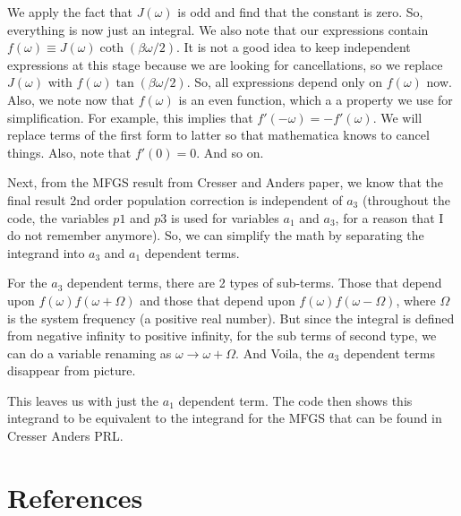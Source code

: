 \documentclass[11pt]{article}
\begin{document}
We apply the fact that $J(\omega)$ is odd and find that the constant is zero. So, everything is now just an integral. We also note that our expressions contain $f(\omega) \equiv J(\omega) \coth(\beta \omega/2)$. It is not a good idea to keep independent expressions at this stage because we are looking for cancellations, so we replace $J(\omega)$ with $f(\omega) \tan(\beta \omega/2)$. So, all expressions depend only on $f(\omega)$ now. Also, we note now that $f(\omega)$ is an even function, which a a property we use for simplification. For example, this implies that $f'(-\omega) = - f'(\omega)$. We will replace terms of the first form to latter so that mathematica knows to cancel things. Also, note that $f'(0)=0$. And so on.

Next, from the MFGS result from Cresser and Anders paper, we know that the final result 2nd order population correction is independent of $a_3$ (throughout the code, the variables $p1$ and $p3$ is used for variables $a_1$ and $a_3$, for a reason that I do not remember anymore). So, we can simplify the math by separating the integrand into $a_3$ and $a_1$ dependent terms. 

For the $a_3$ dependent terms, there are 2 types of sub-terms. Those that depend upon $f(\omega) f(\omega + \Omega)$ and those that depend upon $f(\omega) f(\omega - \Omega)$, where $\Omega$ is the system frequency (a positive real number). But since the integral is defined from negative infinity to positive infinity, for the sub terms of second type, we can do a variable renaming as $\omega \to \omega + \Omega$. And Voila, the $a_3$ dependent terms disappear from picture.

This leaves us with just the $a_1$ dependent term. The code then shows this integrand to be equivalent to the integrand for the MFGS that can be found in Cresser Anders PRL.

\section*{References}

% 
\end{document}
